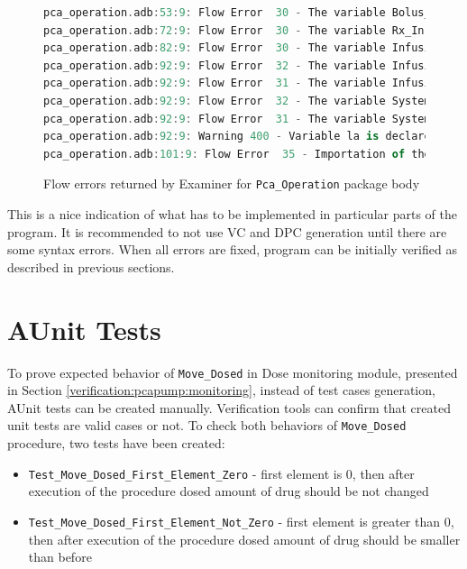 \begin{figure}
\singlespacing
\begin{lstlisting}[language=ada, frame=single, gobble=0]
pca_operation.adb:53:9: Flow Error  30 - The variable Bolus_Duration_In is imported but neither referenced nor exported.
pca_operation.adb:72:9: Flow Error  30 - The variable Rx_In is imported but neither referenced nor exported.
pca_operation.adb:82:9: Flow Error  30 - The variable Infusion_Flow_Rate is imported but neither referenced nor exported.
pca_operation.adb:92:9: Flow Error  32 - The variable Infusion_Flow_Rate is neither imported nor defined.
pca_operation.adb:92:9: Flow Error  31 - The variable Infusion_Flow_Rate is exported but not (internally) defined.
pca_operation.adb:92:9: Flow Error  32 - The variable System_Status is neither imported nor defined.
pca_operation.adb:92:9: Flow Error  31 - The variable System_Status is exported but not (internally) defined.
pca_operation.adb:92:9: Warning 400 - Variable la is declared but not used.
pca_operation.adb:101:9: Flow Error  35 - Importation of the initial value of variable Ada.Real_Time.ClockTime is ineffective.
\end{lstlisting}
\doublespacing
\caption{Flow errors returned by Examiner for \lstinline{Pca_Operation} package body}
\label{listing:verification:pca_generated:flow_errors}
\end{figure}

This is a nice indication of what has to be implemented in particular parts of the program. It is recommended to not use VC and DPC generation until there are some syntax errors. When all errors are fixed, program can be initially verified as described in previous sections.


\section{AUnit Tests}
\label{verification:aunit}

To prove expected behavior of \lstinline{Move_Dosed} in Dose monitoring module, presented in Section \ref{verification:pcapump:monitoring}, instead of test cases generation, AUnit tests can be created manually. Verification tools can confirm that created unit tests are valid cases or not. To check both behaviors of \lstinline{Move_Dosed} procedure, two tests have been created:
\begin{itemize}  \itemsep0pt \parskip0pt 
    \item \lstinline{Test_Move_Dosed_First_Element_Zero} - first element is 0, then after execution of the procedure dosed amount of drug should be not changed
    \item \lstinline{Test_Move_Dosed_First_Element_Not_Zero} - first element is greater than 0, then after execution of the procedure dosed amount of drug should be smaller than before
\end{itemize}

